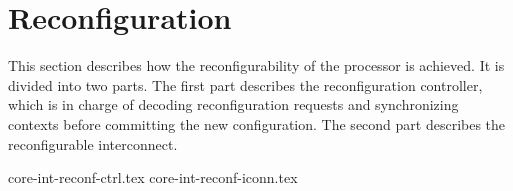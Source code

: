 
\clearpage
\section{Reconfiguration}
\label{sec:core-int-reconf}

This section describes how the reconfigurability of the \rvex{} processor is
achieved. It is divided into two parts. The first part describes the
reconfiguration controller, which is in charge of decoding reconfiguration
requests and synchronizing contexts before committing the new configuration. The
second part describes the reconfigurable interconnect.

{core-int-reconf-ctrl.tex}
{core-int-reconf-iconn.tex}

